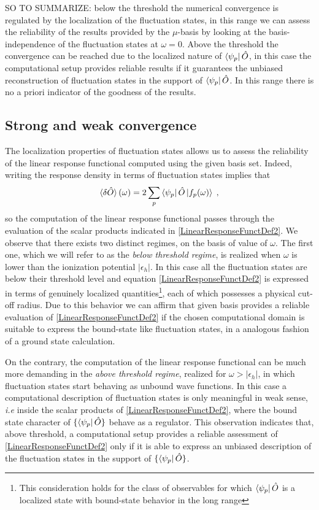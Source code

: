 \documentclass[reprint,aps,prb]{revtex4-1}
\newcommand{\eps}{\epsilon}
\newcommand{\be}{\begin{equation}}
\newcommand{\ee}{\end{equation}}
\newcommand{\lb}{\label}
\newcommand{\op}[1]{\hat {#1}}
\begin{document}
SO TO SUMMARIZE: below the threshold the numerical convergence is regulated by the localization of the fluctuation states, in this range we can assess the reliability of the results provided by
the $\mu$-basis by looking at the basis-independence of the fluctuation states at $\omega=0$. Above the threshold the convergence can be reached due to the localized nature of $\bra{\psi_p}\op O$, 
in this case the computational setup provides reliable results if it guarantees the unbiased reconstruction of fluctuation states in the support of $\bra{\psi_p}\op O$. In this range there is no a 
priori indicator of the goodness of the results. 

\subsection{Strong and weak convergence}

The localization properties of fluctuation states allows us to assess the reliability of the linear response functional computed using the given basis set. Indeed, writing the response 
density in terms of fluctuation states implies that 
\be\lb{LinearResponseFunctDef2}
\braket{\delta\op O}(\omega) = 2\sum_p \bra{\psi_p}\op O\ket{f_p(\omega)} \;,
\ee
so the computation of the linear response functional passes through the evaluation of the scalar products indicated in \eqref{LinearResponseFunctDef2}. We observe that there exists two 
distinct regimes, on the basis of value of $\omega$. The first one, which we will refer to as the \emph{below threshold regime}, is realized when $\omega$ is lower than the ionization 
potential $|\eps_h|$. In this case all the fluctuation states are below their threshold level and equation \eqref{LinearResponseFunctDef2} is expressed in terms of genuinely localized 
quantities\footnote{This consideration holds for the class of observables for which $\bra{\psi_p}\op O$ is a localized state  with bound-state behavior in the long range}, each of which 
possesses a physical cut-off radius. Due to this behavior we can affirm that given basis provides a reliable evaluation of \eqref{LinearResponseFunctDef2} if the chosen computational domain 
is suitable to express the bound-state like fluctuation states, in a analogous fashion of a ground state calculation. 

On the contrary, the computation of the linear response functional can be much more demanding in the \emph{above threshold regime}, realized for $\omega>|\eps_h|$, in which fluctuation 
states start behaving as unbound wave functions. In this case a computational description of fluctuation states is only meaningful in weak sense, \emph{i.e} inside the scalar products of 
\eqref{LinearResponseFunctDef2}, where the bound state character of $\{\bra{\psi_p}\op O\}$ behave as a regulator. This observation indicates that, above threshold, a computational setup 
provides a reliable assessment of \eqref{LinearResponseFunctDef2} only if it is able to express an unbiased description of the fluctuation states in the support of $\{\bra{\psi_p}\op O\}$. 
\end{document}
